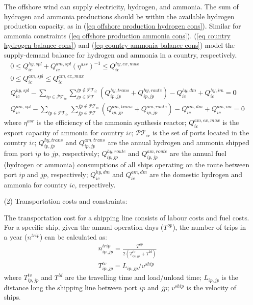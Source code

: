 \documentclass[sn-mathphys,Numbered]{sn-jnl}%
\theoremstyle{thmstyleone}%
\theoremstyle{thmstyletwo}%
\theoremstyle{thmstylethree}%
\begin{document}
The offshore wind can supply electricity, hydrogen, and ammonia. The sum of hydrogen and ammonia productions should be within the available hydrogen production capacity, as in (\ref{eq offshore production hydrogen cons}). Similar for ammonia constraints (\ref{eq offshore production ammonia cons}). (\ref{eq country hydrogen balance cons}) and (\ref{eq country ammonia balance cons}) model the supply-demand balance for hydrogen and ammonia in a country, respectively.
\begin{gather}
    0 \leq Q_{ic}^{hy,spl} + Q_{ic}^{am,spl} (\eta^{asr})^{-1} \leq Q_{ic}^{hy,ex,max}
\label{eq offshore production hydrogen cons}\\
    0 \leq Q_{ic}^{am,spl} \leq Q_{ic}^{am,ex,max}
\label{eq offshore production ammonia cons}\\
    Q_{ic}^{hy,spl} - \sum_{ip \in \mathcal{PT}_{ic}} \sum_{jp \in \mathcal{PT}}^{jp \notin \mathcal{PT}_{ic}} \left( Q_{ip,jp}^{hy,trans} + Q_{ip,jp}^{hy,route} \right) - Q_{ic}^{hy,dm} + Q_{ic}^{hy,im}= 0
\label{eq country hydrogen balance cons}\\
    Q_{ic}^{am,spl} - \sum_{ip \in \mathcal{PT}_{ic}} \sum_{jp \in \mathcal{PT}}^{jp \notin \mathcal{PT}_{ic}} \left( Q_{ip,jp}^{am,trans} + Q_{ip,jp}^{am,route} \right) - Q_{ic}^{am,dm} + Q_{ic}^{am,im}  = 0
\label{eq country ammonia balance cons}
\end{gather}
where $\eta^{asr}$ is the efficiency of the ammonia synthesis reactor; $Q_{ic}^{am,ex,max}$ is the export capacity of ammonia for country $ic$; $\mathcal{PT}_{ic}$ is the set of ports located in the country $ic$; $Q_{ip,jp}^{hy,trans}$ and $Q_{ip,jp}^{am,trans}$ are the annual hydrogen and ammonia shipped from port $ip$ to $jp$, respectively; $Q_{ip,jp}^{hy,route}$ and $Q_{ip,jp}^{am,route}$ are the annual fuel (hydrogen or ammonia) consumptions of all ships operating on the route between port $ip$ and $jp$, respectively; $Q_{ic}^{hy,dm}$ and $Q_{ic}^{am,dm}$ are the domestic hydrogen and ammonia for country $ic$, respectively.

(2) Transportation costs and constraints:

The transportation cost for a shipping line consists of labour costs and fuel costs. For a specific ship, given the annual operation days ($T^{op}$), the number of trips in a year ($n^{trip}$) can be calculated as:
\begin{gather}
    n_{ip,jp}^{trip} = \frac{T^{op}}{2(T_{ip,jp}^{tv} + T^{ld})}
\\
    T_{ip,jp}^{tv} = L_{ip,jp} / v^{ship}
\end{gather}
where $T_{ip,jp}^{tv}$ and $T^{ld}$ are the travelling time and load/unload time; $L_{ip,jp}$ is the distance long the shipping line between port $ip$ and $jp$; $v^{ship}$ is the velocity of ships.
\end{document}
